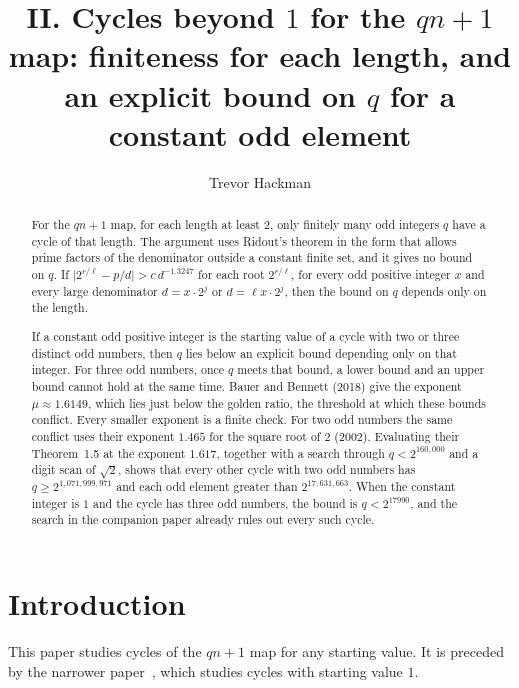 \documentclass[11pt]{article}
\title{II. Cycles beyond $1$ for the $qn+1$ map: finiteness for each length, and an explicit bound on $q$ for a constant odd element}
\author{Trevor Hackman}
\date{}
\begin{document}
\maketitle

\begin{abstract}
\setlength{\parskip}{\baselineskip}%
\setlength{\parindent}{0pt}%
\noindent
For the $qn+1$ map, for each length at least $2$, only finitely many odd integers $q$ have a cycle of that length.
The argument uses Ridout's theorem in the form that allows prime factors of the denominator outside a constant finite set, and it gives no bound on $q$.
If $\lvert 2^{r/\ell} - p/d \rvert > c\, d^{-1.3247}$ for each root $2^{r/\ell}$, for every odd positive integer $x$ and every large denominator $d = x\cdot 2^j$ or $d = \ell x\cdot 2^j$, then the bound on $q$ depends only on the length.

If a constant odd positive integer is the starting value of a cycle with two or three distinct odd numbers, then $q$ lies below an explicit bound depending only on that integer.
For three odd numbers, once $q$ meets that bound, a lower bound and an upper bound cannot hold at the same time.
Bauer and Bennett (2018) give the exponent $\mu \approx 1.6149$, which lies just below the golden ratio, the threshold at which these bounds conflict.
Every smaller exponent is a finite check.
For two odd numbers the same conflict uses their exponent $1.465$ for the square root of $2$ (2002).
Evaluating their Theorem~1.5 at the exponent $1.617$, together with a search through $q < 2^{160{,}000}$ and a digit scan of $\sqrt{2}$, shows that every other cycle with two odd numbers has $q \ge 2^{1{,}071{,}999{,}971}$ and each odd element greater than $2^{17{,}631{,}663}$.
When the constant integer is $1$ and the cycle has three odd numbers, the bound is $q < 2^{17990}$, and the search in the companion paper already rules out every such cycle.
\end{abstract}

\begingroup
\setlength{\parskip}{0pt}
\small
\tableofcontents
\endgroup

\section{Introduction}
\label{sec:introduction}

This paper studies cycles of the $qn+1$ map for any starting value.
It is preceded by the narrower paper~\cite{hackman-i}, which studies cycles with starting value $1$.
\end{document}
